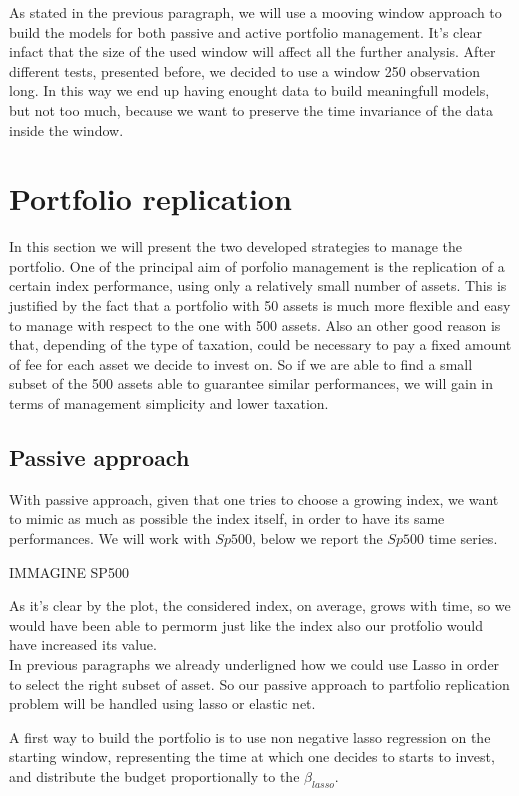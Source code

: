 \documentclass{article}%
\begin{document}
As stated in the previous paragraph, we will use a mooving window approach to build the models for both passive and active portfolio management. It's clear infact that the size of the used window will affect all the further analysis. After different tests, presented before, we decided to use a window 250 observation long. In this way we end up having enought data to build meaningfull models, but not too much, because we want to preserve the time invariance of the data inside the window.





\newpage
\section{Portfolio replication}
In this section we will present the two developed strategies to manage the portfolio. 
One of  the principal aim of porfolio management is the replication of a certain index performance, using only a relatively small number of assets. This is justified by the fact that a portfolio with 50 assets is much more flexible and easy to manage with respect to the one with 500 assets. Also an other good reason is that, depending of the type of taxation, could be necessary to pay a fixed amount of fee for each asset we decide to invest on. So if we are able to find a small subset of the 500 assets able to guarantee similar performances, we will gain in terms of management simplicity and lower taxation.

\subsection{Passive approach}

With passive approach, given that one tries to choose a growing index, we want to mimic as much as possible the index itself, in order to have its same performances.
We will work with $Sp500$, below we report the $Sp500$ time series.


	IMMAGINE     SP500
	
As it's clear by the plot, the considered index, on average, grows with time, so we would have been able to permorm just like the index also our protfolio would have increased its value.
\\

In previous paragraphs we already underligned how we could use Lasso in order to select the right subset of asset. So our passive approach to partfolio replication problem will be handled using lasso or elastic net.

A first way to build the portfolio is to use non negative lasso regression on the starting window, representing the time at which one decides to starts to invest, and distribute the budget proportionally to the $\beta_{lasso}$. 
\end{document}
